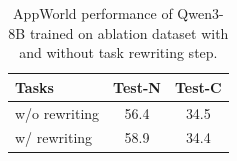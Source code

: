 \begin{table}[t!]
\centering
\small
\setlength{\tabcolsep}{3pt}
\begin{tabular*}{\linewidth}{@{\extracolsep{\fill}}lcc@{}}
\toprule
\textbf{Tasks} & \textbf{Test-N} & \textbf{Test-C} \\
\midrule
w/o rewriting & 56.4 & 34.5 \\
\midrule
w/ rewriting & 58.9 & 34.4 \\ 
\bottomrule
\end{tabular*}
\caption{AppWorld performance of Qwen3-8B trained on ablation dataset with and without task rewriting step.}
\label{tab:task_rewriting}
\end{table}
